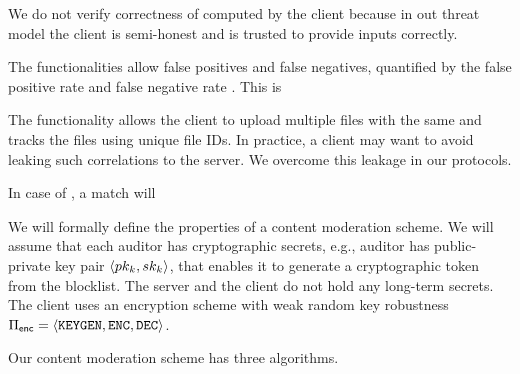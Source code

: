 \enumListStart



\item We do not verify correctness of \contentToken{\clientData} computed by the client because in out threat model 
the client is semi-honest and is trusted to provide inputs correctly. 

\item The functionalities allow false positives and false negatives, quantified by the false positive rate \fpr and false negative rate \fnr. This is 


\item The functionality allows the client to upload multiple files with the same \contentToken{\clientData} and tracks the files using unique file IDs. In practice, a client may want to avoid leaking such correlations to the server. We overcome this leakage in our protocols.




\item In case of \contentModFuncExact, a match will 

\enumListEnd
\fi 


%

\iffalse 
We will formally define the properties of a content moderation scheme. 
We will assume that each auditor has cryptographic secrets, e.g., auditor \auditorIdx has public-private 
key pair  $\tupleDefn{\pubKey[\auditorIdx], 
\privKey[\auditorIdx]}$, that enables it to generate a cryptographic token 
from the blocklist. The server and the client do not hold any long-term secrets. 
The client uses an encryption scheme with weak random key robustness 
$\encryptionSchemeDefn$.

Our content moderation scheme has three algorithms.

